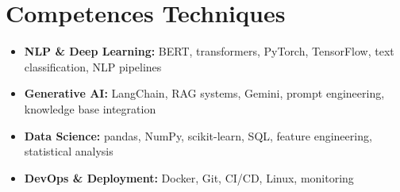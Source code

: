 \documentclass[a4paper,11pt]{article}
\begin{document}
\section{Competences Techniques}
\begin{itemize}[leftmargin=*, nosep]
    \item \small{\textbf{NLP \& Deep Learning:} BERT, transformers, PyTorch, TensorFlow, text classification, NLP pipelines}
    \item \small{\textbf{Generative AI:} LangChain, RAG systems, Gemini, prompt engineering, knowledge base integration}
    \item \small{\textbf{Data Science:} pandas, NumPy, scikit-learn, SQL, feature engineering, statistical analysis}
    \item \small{\textbf{DevOps \& Deployment:} Docker, Git, CI/CD, Linux, monitoring}
\end{itemize}
\end{document}
